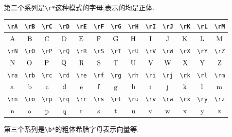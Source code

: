 \documentclass[lang=cn,12pt,scheme=chinese,mode=simple,black]{elegantbook}
\begin{document}
\vspace{1cm}

第二个系列是\verb|\r*|这种模式的字母,表示的均是正体.

\begin{center}
\renewcommand{\arraystretch}{1.4}
\setlength{\tabcolsep}{6pt}
\begin{tabular}{|c|c|c|c|c|c|c|c|c|c|c|c|c|}
\hline\hline
\verb|\rA| & \verb|\rB| & \verb|\rC| & \verb|\rD| & \verb|\rE| & \verb|\rF| & \verb|\rG| & \verb|\rH| & \verb|\rI| & \verb|\rJ| & \verb|\rK| & \verb|\rL| & \verb|\rM|\\
\hline
$\rA$ & $\rB$ & $\rC$ & $\rD$ & $\rE$ & $\rF$ & $\rG$ & $\rH$ & $\rI$ & $\rJ$ & $\rK$ & $\rL$ & $\rM$\\
\hline\hline
\verb|\rN| & \verb|\rO| & \verb|\rP| & \verb|\rQ| & \verb|\rR| & \verb|\rS| & \verb|\rT| & \verb|\rU| & \verb|\rV| & \verb|\rW| & \verb|\rX| & \verb|\rY| & \verb|\rZ|\\
\hline
$\rN$ & $\rO$ & $\rP$ & $\rQ$ & $\rR$ & $\rS$ & $\rT$ & $\rU$ & $\rV$ & $\rW$ & $\rX$ & $\rY$ & $\rZ$\\
\hline\hline
\verb|\ra| & \verb|\rb| & \verb|\rc| & \verb|\rd| & \verb|\re| & \verb|\rf| & \verb|\rg| & \verb|\rh| & \verb|\ri| & \verb|\rj| & \verb|\rk| & \verb|\rl| & \verb|\rm|\\
\hline
$\ra$ & $\rb$ & $\rc$ & $\rd$ & $\re$ & $\rf$ & $\rg$ & $\rh$ & $\ri$ & $\rj$ & $\rk$ & $\rl$ & $\rm$\\
\hline\hline
\verb|\rn| & \verb|\ro| & \verb|\rp| & \verb|\rq| & \verb|\rr| & \verb|\rs| & \verb|\rt| & \verb|\ru| & \verb|\rv| & \verb|\rw| & \verb|\rx| & \verb|\ry| & \verb|\rz|\\
\hline
$\rn$ & $\ro$ & $\rp$ & $\rq$ & $\rr$ & $\rs$ & $\rt$ & $\ru$ & $\rv$ & $\rw$ & $\rx$ & $\ry$ & $\rz$\\
\hline\hline
\end{tabular}
\end{center}

\vspace{1cm}
\newpage
第三个系列是\verb|\b*|的粗体希腊字母表示向量等.
\end{document}
